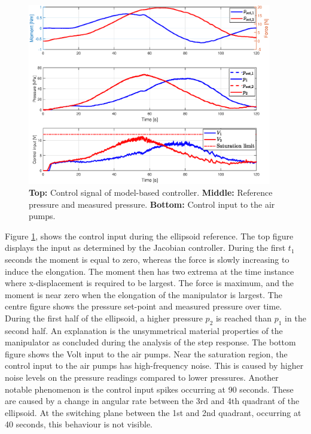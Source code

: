 \begin{figure}[H]
    \centering
    \includegraphics[width = 0.95\textwidth]{Figures/Chapter5/inputsellips.eps}
    \caption{\textbf{Top:} Control signal of model-based controller. \textbf{Middle:} Reference pressure and measured pressure. \textbf{Bottom:} Control input to the air pumps.}
    \label{fig5:controlellips}
\end{figure}


Figure \ref{fig5:controlellips}, shows the control input during the ellipsoid reference. The top figure displays the input as determined by the Jacobian controller. During the first $t_1$ seconds the moment is equal to zero, whereas the force is slowly increasing to induce the elongation. The moment then has two extrema at the time instance where x-displacement is required to be largest. The force is maximum, and the moment is near zero when the elongation of the manipulator is largest. The centre figure shows the pressure set-point and measured pressure over time. During the first half of the ellipsoid, a higher pressure $p_2$ is reached than $p_1$ in the second half. An explanation is the unsymmetrical material properties of the manipulator as concluded during the analysis of the step response. The bottom figure shows the Volt input to the air pumps. Near the saturation region, the control input to the air pumps has high-frequency noise. This is caused by higher noise levels on the pressure readings compared to lower pressures. Another notable phenomenon is the control input spikes occurring at 90 seconds. These are caused by a change in angular rate between the 3rd and 4th quadrant of the ellipsoid. At the switching plane between the 1st and 2nd quadrant, occurring at 40 seconds, this behaviour is not visible.




